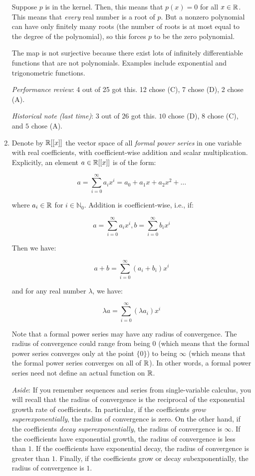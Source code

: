 \documentclass[10pt]{amsart}
\begin{document}
\begin{enumerate}
  Suppose $p$ is in the kernel. Then, this means that $p(x) = 0$ for
  all $x \in \mathbb{R}$. This means that {\em every} real number is a root of
  $p$. But a nonzero polynomial can have only finitely many roots (the
  number of roots is at most equal to the degree of the polynomial), so
  this forces $p$ to be the zero polynomial.

  The map is not surjective because there exist lots of infinitely
  differentiable functions that are not polynomials. Examples include
  exponential and trigonometric functions.

  {\em Performance review}: 4 out of 25 got this. 12 chose (C), 7
  chose (D), 2 chose (A).

  {\em Historical note (last time)}: $3$ out of $26$ got
  this. $10$ chose (D), $8$ chose (C), and $5$ chose (A).

\item Denote by $\mathbb{R}[[x]]$ the vector space of all {\em formal power
  series} in one variable with real coefficients, with
  coefficient-wise addition and scalar multiplication. Explicitly, an
  element $a \in \mathbb{R}[[x]]$ is of the form:

  $$a = \sum_{i=0}^\infty a_ix^i = a_0 + a_1x + a_2x^2 + \dots$$

  where $a_i \in \mathbb{R}$ for $i \in \mathbb{N}_0$. Addition is
  coefficient-wise, i.e., if:

  $$a = \sum_{i=0}^\infty a_ix^i, b = \sum_{i=0}^\infty b_ix^i$$

  Then we have:

  $$a + b = \sum_{i=0}^\infty (a_i + b_i)x^i$$

  and for any real number $\lambda$, we have:

  $$\lambda a = \sum_{i=0}^\infty (\lambda a_i)x^i$$

  Note that a formal power series may have any radius of
  convergence. The radius of convergence could range from being $0$
  (which means that the formal power series converges only at the
  point $\{ 0 \}$) to being $\infty$ (which means that the formal
  power series converges on all of $\mathbb{R}$). In other words, a formal
  power series need not define an actual function on $\mathbb{R}$.

  {\em Aside}: If you remember sequences and series from
  single-variable calculus, you will recall that the radius of
  convergence is the reciprocal of the exponential growth rate of
  coefficients. In particular, if the coefficients {\em grow
    superexponentially}, the radius of convergence is zero. On the
  other hand, if the coefficients {\em decay superexponentially}, the
  radius of convergence is $\infty$. If the coefficients have
  exponential growth, the radius of convergence is less than $1$. If
  the coefficients have exponential decay, the radius of convergence
  is greater than $1$. Finally, if the coefficients grow or decay
  subexponentially, the radius of convergence is $1$.


\end{enumerate}
\end{document}
